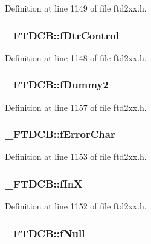 Definition at line 1149 of file ftd2xx.h.\hypertarget{struct__FTDCB_a770cbe04afe4551d954b460e15bc253e}{
\subsubsection[{fDtrControl}]{ {\bf \_\-FTDCB::fDtrControl}}}
\label{struct__FTDCB_a770cbe04afe4551d954b460e15bc253e}


Definition at line 1148 of file ftd2xx.h.\hypertarget{struct__FTDCB_a14be508970e6bf12df194454e7d77583}{
\subsubsection[{fDummy2}]{ {\bf \_\-FTDCB::fDummy2}}}
\label{struct__FTDCB_a14be508970e6bf12df194454e7d77583}


Definition at line 1157 of file ftd2xx.h.\hypertarget{struct__FTDCB_a3d6289c590aebe652fbbdf4f173b16af}{
\subsubsection[{fErrorChar}]{ {\bf \_\-FTDCB::fErrorChar}}}
\label{struct__FTDCB_a3d6289c590aebe652fbbdf4f173b16af}


Definition at line 1153 of file ftd2xx.h.\hypertarget{struct__FTDCB_a478569c6c3f26180e3f6326f7d123959}{
\subsubsection[{fInX}]{ {\bf \_\-FTDCB::fInX}}}
\label{struct__FTDCB_a478569c6c3f26180e3f6326f7d123959}


Definition at line 1152 of file ftd2xx.h.\hypertarget{struct__FTDCB_a96cdd935996bf8ebdfc841db6a526159}{
\subsubsection[{fNull}]{ {\bf \_\-FTDCB::fNull}}}
\label{struct__FTDCB_a96cdd935996bf8ebdfc841db6a526159}


